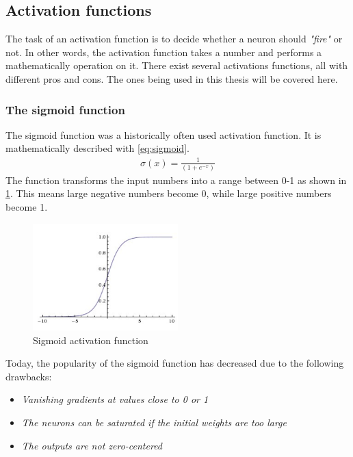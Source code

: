\documentclass[USenglish]{ifimaster}  %
\begin{document}
\subsection{Activation functions}
The task of an activation function is to decide whether a neuron should \textit{"fire"} or not. In other words, the activation function takes a number and performs a mathematically operation on it. There exist several activations functions, all with different pros and cons. The ones being used in this thesis will be covered here.
\subsubsection{The sigmoid function}
The sigmoid function was a historically often used activation function. It is mathematically described with \cref{eq:sigmoid}.
\begin{equation}\label{eq:sigmoid}
\begin{aligned}
\sigma(x) = \frac{1}{(1 + e^{-x})}
\end{aligned}
\end{equation}
The function transforms the input numbers into a range between 0-1 as shown in \cref{fig:sigmoid}. This means large negative numbers become 0, while large positive numbers become 1.
\begin{figure}[ht]
    \centering
    \includegraphics[width=0.5\textwidth]{bilder/sigmoid_function.png}
    \caption{Sigmoid activation function \cite{website:cs231n_activation_functions}}
    \label{fig:sigmoid}
\end{figure}
Today, the popularity of the sigmoid function has decreased due to the following drawbacks:
\begin{itemize}
    \item \textit{Vanishing gradients at values close to 0 or 1}
    \item \textit{The neurons can be saturated if the initial weights are too large}
    \item \textit{The outputs are not zero-centered}
\end{itemize}
\end{document}
